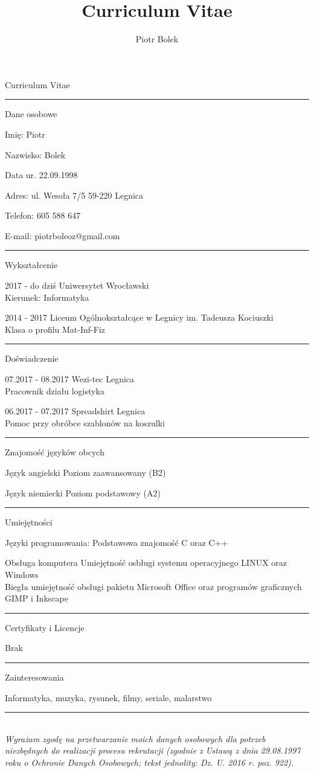 \documentclass[a4paper]{article}
\begin{document}
\title{Curriculum Vitae}
\author{Piotr Bolek}

\begin{cv}{\huge Curriculum Vitae\\}
	\hrule
	\begin{cvlist}{Dane osobowe}
		\item[Imię:]Piotr
		\item[Nazwisko:]Bolek
		\item[Data ur.] 22.09.1998
		\item[Adres:]ul. Wesoła 7/5 59-220 Legnica
		\item[Telefon:]605 588 647
		\item[E-mail:]piotrboleoz@gmail.com
	\end{cvlist}
	\hrule
	\begin{cvlist}{Wykształcenie}
		\item[2017 - do dziś]Uniwersytet Wrocławski \\ Kierunek: Informatyka
		\item[2014 - 2017]Liceum Ogólnokształcące w Legnicy im. Tadeusza Kociuszki \\ Klasa o profilu Mat-Inf-Fiz
	\end{cvlist}
	\hrule
	\begin{cvlist}{Doświadczenie}
		\item[07.2017 - 08.2017]Wezi-tec Legnica \\ Pracownik działu logistyka
		\item[06.2017 - 07.2017]Spreadshirt Legnica \\ Pomoc przy obróbce szablonów na koszulki
	\end{cvlist}
	\hrule
	\begin{cvlist}{Znajomość języków obcych}
		\item[Język angielski]Poziom zaawansowany (B2)
		\item[Język niemiecki]Poziom podstawowy (A2)
	\end{cvlist}
	\hrule
	\begin{cvlist}{Umiejętności}
		\item[Języki programowania:]Podstawowa znajomość C oraz C++
		\item[Obsługa komputera]Umiejętność osbługi systemu operacyjnego LINUX oraz Windows \\ 
			Biegła umiejętność obsługi pakietu Microsoft Office oraz programów graficznych GIMP i Inkscape 		
	\end{cvlist}
	\hrule
	\begin{cvlist}{Certyfikaty i Licencje}
		\item[Brak]
	\end{cvlist}
	\hrule
	\begin{cvlist}{Zainteresowania}
		\item[]Informatyka, muzyka, rysunek, filmy, seriale, malarstwo 
	\end{cvlist}
	\hrule
	\textit{\small \\Wyrażam zgodę na przetwarzanie moich danych osobowych dla potrzeb niezbędnych do realizacji procesu rekrutacji (zgodnie z Ustawą z dnia 29.08.1997 roku o Ochronie Danych Osobowych; tekst jednolity: Dz. U. 2016 r. poz. 922).}\\
\end{cv}
\end{document}
